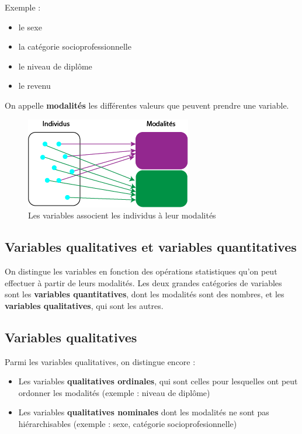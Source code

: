 \documentclass[
]{book}
\providecommand{\tightlist}{%
  \setlength{\itemsep}{0pt}\setlength{\parskip}{0pt}}
\begin{document}
Exemple :

\begin{itemize}
\tightlist
\item
  le sexe
\item
  la catégorie socioprofessionnelle
\item
  le niveau de diplôme
\item
  le revenu
\end{itemize}

On appelle \textbf{modalités} les différentes valeurs que peuvent prendre une variable.

\begin{figure}
\centering
\includegraphics{images/modalites.png}
\caption{Les variables associent les individus à leur modalités}
\end{figure}

\hypertarget{variables-qualitatives-et-variables-quantitatives}{%
\subsection{Variables qualitatives et variables quantitatives}\label{variables-qualitatives-et-variables-quantitatives}}

On distingue les variables en fonction des opérations statistiques qu'on peut effectuer à partir de leurs modalités. Les deux grandes catégories de variables sont les \textbf{variables quantitatives}, dont les modalités sont des nombres, et les \textbf{variables qualitatives}, qui sont les autres.

\hypertarget{variables-qualitatives}{%
\subsection{Variables qualitatives}\label{variables-qualitatives}}

Parmi les variables qualitatives, on distingue encore :

\begin{itemize}
\tightlist
\item
  Les variables \textbf{qualitatives ordinales}, qui sont celles pour lesquelles ont peut ordonner les modalités (exemple : niveau de diplôme)
\item
  Les variables \textbf{qualitatives nominales} dont les modalités ne sont pas hiérarchisables (exemple : sexe, catégorie socioprofesionnelle)
\end{itemize}
\end{document}
